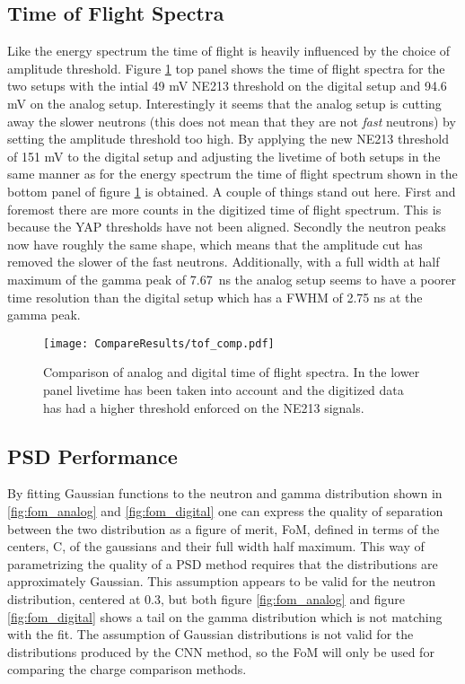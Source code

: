 \documentclass[main.tex]{subfiles}
\begin{document}
\subsection{Time of Flight Spectra}
Like the energy spectrum the time of flight is heavily influenced by the choice of amplitude threshold. Figure \ref{fig:tof_comp} top panel shows the time of flight spectra for the two setups with the intial 49 mV NE213 threshold on the digital setup and 94.6 mV on the analog setup. Interestingly it seems that the analog setup is cutting away the slower neutrons (this does not mean that they are not \textit{fast} neutrons) by setting the amplitude threshold too high. By applying the new NE213 threshold of 151 mV to the digital setup and adjusting the livetime of both setups in the same manner as for the energy spectrum the time of flight spectrum shown in the bottom panel of figure \ref{fig:tof_comp} is obtained. A couple of things stand out here. First and foremost there are more counts in the digitized time of flight spectrum. This is because the YAP thresholds have not been aligned. Secondly the neutron peaks now have roughly the same shape, which means that the amplitude cut has removed the slower of the fast neutrons. Additionally, with a full width at half maximum of the gamma peak of \SI{7.67}{\ns} the analog setup seems to have a poorer time resolution than the digital setup which has a FWHM of 2.75 ns at the gamma peak.

\begin{figure}[h]
    \centering
        \texttt{[image: CompareResults/tof\_comp.pdf]}
        \caption{Comparison of analog and digital time of flight spectra. In the lower panel livetime has been taken into account and the digitized data has had a higher threshold enforced on the NE213 signals.}
    \label{fig:tof_comp}
\end{figure}

\subsection{PSD Performance}
By fitting Gaussian functions to the neutron and gamma distribution shown in \ref{fig:fom_analog} and \ref{fig:fom_digital} one can express the quality of separation between the two distribution as a figure of merit, FoM, defined in terms of the centers, C, of the gaussians and their full width half maximum. This way of parametrizing the quality of a PSD method requires that the distributions are approximately Gaussian. This assumption appears to be valid for the neutron distribution, centered at 0.3, but both figure \ref{fig:fom_analog} and figure \ref{fig:fom_digital} shows a tail on the gamma distribution which is not matching with the fit. The assumption of Gaussian distributions is not valid for the distributions produced by the CNN method, so the FoM will only be used for comparing the charge comparison methods. 
\end{document}
